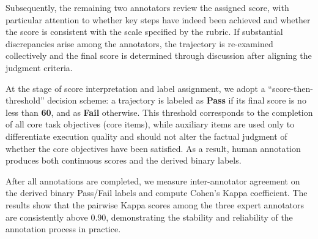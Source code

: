 Subsequently, the remaining two annotators review the assigned score, with particular attention to whether key steps have indeed been achieved and whether the score is consistent with the scale specified by the rubric. If substantial discrepancies arise among the annotators, the trajectory is re-examined collectively and the final score is determined through discussion after aligning the judgment criteria.

At the stage of score interpretation and label assignment, we adopt a ``score-then-threshold'' decision scheme: a trajectory is labeled as \textbf{Pass} if its final score is no less than \textbf{60}, and as \textbf{Fail} otherwise. This threshold corresponds to the completion of all core task objectives (core items), while auxiliary items are used only to differentiate execution quality and should not alter the factual judgment of whether the core objectives have been satisfied. As a result, human annotation produces both continuous scores and the derived binary labels.

After all annotations are completed, we measure inter-annotator agreement on the derived binary Pass/Fail labels and compute Cohen’s Kappa coefficient. The results show that the pairwise Kappa scores among the three expert annotators are consistently above 0.90, demonstrating the stability and reliability of the annotation process in practice.



